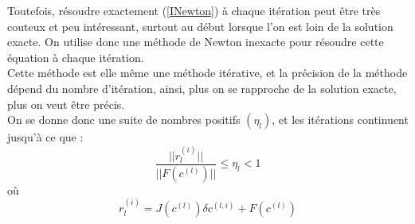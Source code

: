 Toutefois, résoudre exactement (\ref{INewton}) à chaque itération peut être très couteux et peu intéressant, surtout au début lorsque l'on est loin de la solution exacte. On utilise donc une méthode de Newton inexacte pour résoudre cette équation à chaque itération.\\
Cette méthode est elle même une méthode itérative, et la précision de la méthode dépend du nombre d'itération, ainsi, plus on se rapproche de la solution exacte, plus on veut être précis.
\\On se donne donc une suite de nombres positifs $(\eta_l)$, et les itérations continuent jusqu'à ce que :
\[
\frac{||r_l^{(i)}||}{||F(c^{(l)})||} \leq \eta_l<1
\]
où
\[
r_l^{(i)} = J(c^{(l)})\delta c^{(l,i)} + F(c^{(l)})
\]

\iffalse

\subsection{Composantes $(x,y,z)$}
Si l'on ne suppose pas $\bm{g}=(0,0,g_3)$, on a : 
\[
\bm{g}=
\begin{pmatrix}
g_1\\
g_2\\
g_3
\end{pmatrix}
\text{ et }
\rot\bm{g}=
\begin{pmatrix}
\delta_y(g_3)-\delta_z(g_2)\\
\delta_z(g_1)-\delta_x(g_3)\\
\delta_x(g_2)-\delta_y(g_1)
\end{pmatrix}
\]

La condition $\bm{g}\cdot\bm{n}=0$ mène sur l'entrée et la sortie, de la même manière que dans \ref{freefem1d} à $g_3=0$, tandis que sur le tour du cylindre, on peut prendre $g_1=g_2=0$ pour satisfaire cette condition.\\

On peut utiliser la contrainte $\div\bm{g}=0$, qui est continue sur les bords, donc applicables sur le tour du cylindre, pour contraindre $g_3$. Comme sur le tour, $g_1=g_2=0$, on a que $\div\bm{g}=\delta_z(g_3)=0$, donc $g_3$ est une constante sur le tour du cylindre, on peut prendre cette constante égale à 0.\\

La condition $\rot\bm{g}\cdot\bm{n}=0$, sur l'entrée et la sortie se lit $\delta_x(g_2)=\delta_y(g_1)$, toujours de la même façon, prendre $g_1$ constant et $g_2$ constant permet de satisfaire la condition.\\

Comme toutes ces contraintes s'expriment par le fait que $\bm{g}$ doit être une constante, on peut choisir cette constante, par exemple, $\bm{g}=0$.

\fi


